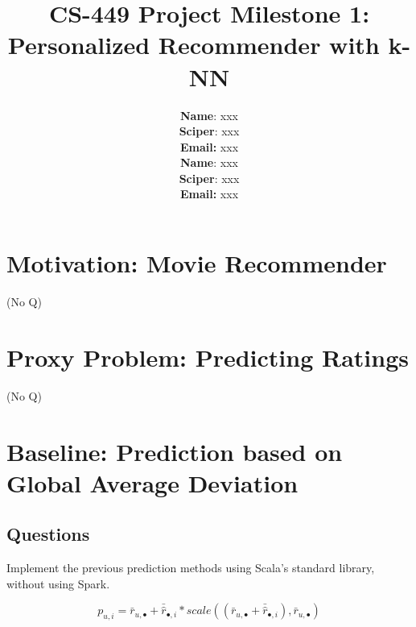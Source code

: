 \documentclass{article}
\title{CS-449 Project Milestone 1: Personalized Recommender with k-NN}
\author{
\textbf{Name}: xxx\\
\textbf{Sciper}: xxx\\
\textbf{Email:} xxx\\
\textbf{Name}: xxx\\
\textbf{Sciper}: xxx\\
\textbf{Email:} xxx\\
}
\begin{document}
\maketitle

\section{Motivation: Movie Recommender}
(No Q)
\section{Proxy Problem: Predicting Ratings}
(No Q)

\section{Baseline: Prediction based on Global Average Deviation}
\subsection{Questions}
\label{section:q1}

Implement the previous prediction methods using Scala's standard library, without using Spark.

\begin{equation}
    \label{eq:baseline}
    p_{u,i} = \bar r_{u,\bullet} + \bar{\hat r}_{\bullet,i} * scale( (\bar r_{u,\bullet} + \bar{\hat r}_{\bullet,i}), \bar r_{u,\bullet})
\end{equation}
  
\end{document}
